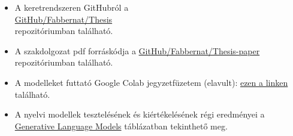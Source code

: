 \documentclass[12pt]{report}
\theoremstyle{definition}
\begin{document}
\begin{itemize}
\item A keretrendszeren GitHubról a\\ \href{https://github.com/Fabbernat/Thesis}{GitHub/Fabbernat/Thesis}\\ repozitóriumban található.

\item A szakdolgozat pdf forráskódja a \href{https://github.com/Fabbernat/Thesis-paper}{GitHub/Fabbernat/Thesis-paper}\\ repozitóriumban található.

    \item
\label{att:colab}
A modelleket futtató Google Colab jegyzetfüzetem (elavult):
\href{https://colab.research.google.com/drive/1yA8IAd5z2oreKUXha-16Du2YrNhemNiU?usp=sharing}{ezen a linken}  található.

\item A nyelvi modellek tesztelésének és kiértékelésének régi eredményei a
\href{https://docs.google.com/spreadsheets/d/1y49lg52LHVFmTom-0ibCqYqWA1pKKhiUny-Pf3KVTIg/edit?usp=sharing}{Generative Language Models}
táblázatban tekinthető meg.
\end{itemize}
\end{document}
